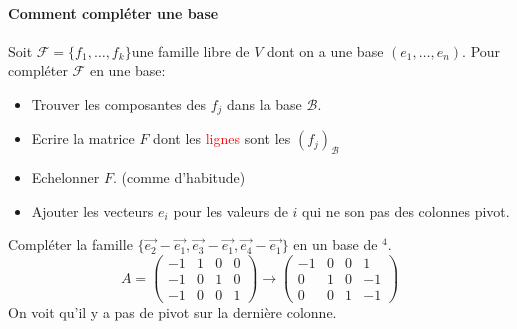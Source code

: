 \paragraph{Comment compléter une base}
Soit $\mathcal{F} = \{f_1, \dots, f_k\}$une famille libre de $V$ dont on a une base $(e_1, \dots, e_n)$. Pour compléter $\mathcal{F}$ en une base:
\begin{itemize}
    \item Trouver les composantes des $f_j$ dans la base $\mathcal{B}$.
    \item Ecrire la matrice $F$ dont les \textcolor{red}{lignes} sont les $(f_j)_{\mathcal{B}}$
    \item Echelonner $F$. (comme d'habitude)
    \item Ajouter les vecteurs $e_i$ pour les valeurs de $i$ qui ne son pas des colonnes pivot.
\end{itemize}

\begin{exemple}
    Compléter la famille $\{\vec{e_2} -\vec{e_1}, \vec{e_3} -\vec{e_1}, \vec{e_4} - \vec{e_1}\}$ en un base de \R$^4$.
    \[A = \begin{pmatrix}
        -1 & 1 & 0 & 0 \\
        -1&0&1 & 0\\
        -1&0&0 & 1
    \end{pmatrix}\to \begin{pmatrix}
        -1 & 0 & 0 & 1 \\
        0&1&0 & -1\\
        0&0&1 & -1
    \end{pmatrix} \]
    On voit qu'il y a pas de pivot sur la dernière colonne.
\end{exemple}


